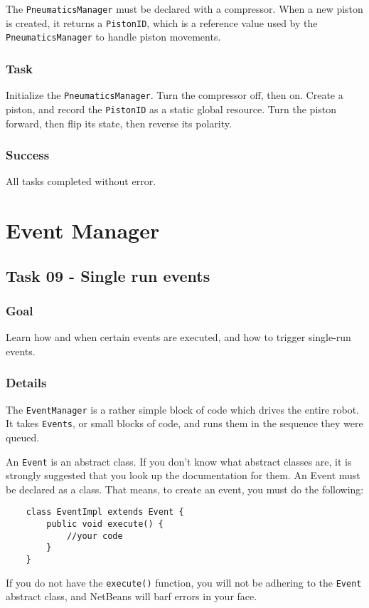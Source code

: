 \documentclass[a4paper]{article}
\begin{document}
The \lstinline{PneumaticsManager} must be declared with a compressor. When a new piston is created, it returns a \lstinline{PistonID}, which is a reference value used by the \lstinline{PneumaticsManager} to handle piston movements.
\subsubsection{Task} Initialize the \lstinline{PneumaticsManager}. Turn the compressor off, then on. Create a piston, and record the \lstinline{PistonID} as a static global resource. Turn the piston forward, then flip its state, then reverse its polarity.
\subsubsection{Success} All tasks completed without error.


\section{Event Manager}\setcounter{subsection}{8}

\subsection{Task 09 - Single run events}
\subsubsection{Goal} Learn how and when certain events are executed, and how to trigger single-run events.
\subsubsection{Details} The \lstinline{EventManager} is a rather simple block of code which drives the entire robot. It takes \lstinline{Events}, or small blocks of code, and runs them in the sequence they were queued.

An \lstinline{Event} is an abstract class. If you don't know what abstract classes are, it is strongly suggested that you look up the documentation for them. An Event must be declared as a class. That means, to create an event, you must do the following:

\begin{lstlisting}
	class EventImpl extends Event {
		public void execute() {
			//your code
		}
	}
\end{lstlisting}

If you do not have the \lstinline{execute()} function, you will not be adhering to the \lstinline{Event} abstract class, and NetBeans will barf errors in your face.
\end{document}
